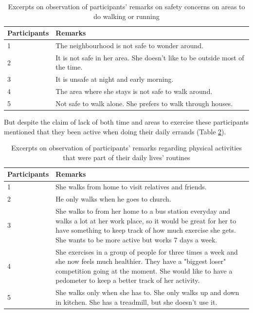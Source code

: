 \begin{table}[h!]
\begin{center}
    \caption{Excerpts on observation of participants’ remarks on safety concerns on areas to do walking or running}
    \label{table:safety_issues}
	\begin{tabular}{|p{2.5cm}|p{10.5cm}|}
		\hline
		 \textbf{Participants}&\textbf{Remarks}\\
	  \hline
	  1&The neighbourhood is not safe to wonder around.\\
	  \hline
	  2&It is not safe in her area. She doesn't like to be outside most of the time.\\
	  \hline
	  3&It is unsafe at night and early morning.\\
	  \hline
	  4&The area where she stays is not safe to walk around.\\
	  \hline
	 5&Not safe to walk alone. She prefers to walk through houses.\\
	 \hline
	\end{tabular}
  \end{center}
\end{table}

But despite the claim of lack of both time and areas to exercise these participants mentioned that they been active when doing their daily errands (Table \ref{table:daily_activity}). 

\begin{table}[h!]
\begin{center}
    \caption{Excerpts on observation of participants' remarks regarding physical activities that were part of their daily lives' routines}
    \label{table:daily_activity}
	\begin{tabular}{|p{2.5cm}|p{10.5cm}|}
		\hline
		 \textbf{Participants}&\textbf{Remarks}\\
	  \hline
	  1& She walks from home to visit relatives and friends.\\
	  \hline
	  2&He only walks when he goes to church.\\
	  \hline
	  3&She walks to from her home to a bus station everyday and walks a lot at her work place, so it would be great for her to have something to keep track of how much exercise she gets. She wants to be more active but works 7 days a week.\\
	  \hline
	  4&She exercises in a group of people for three times a week and she now feels much healthier. They have a "biggest loser" competition going at the moment. She would like to have a pedometer to keep a better track of her activity.\\
	  \hline
	 5&She walks only when she has to. She only walks up and down in kitchen. She has a treadmill, but she doesn't use it.\\
	 \hline
	\end{tabular}
  \end{center}
\end{table}

